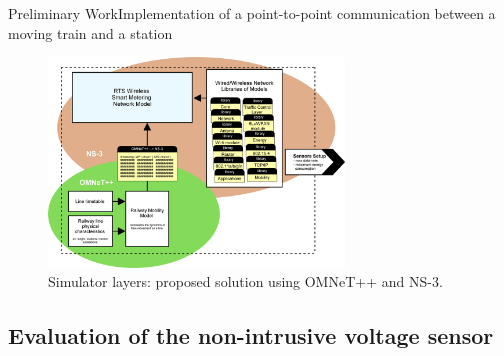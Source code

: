 \begin{frame}{Preliminary Work}{Implementation of a point-to-point communication between a moving train and a station}

\begin{figure}[ht!]
	\centering
	\includegraphics[width=0.70\textwidth,keepaspectratio]{figures/50.PreliminaryW/omnetpp+ns32}
	\caption{Simulator layers: proposed solution using OMNeT++ and NS-3.}
\end{figure}


\end{frame}

\subsection{Evaluation of the non-intrusive voltage sensor}

